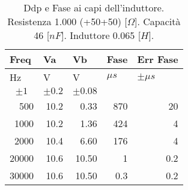 \begin{table}[H]
\begin{center}
\begin{tabular}{|r|r|r|r|r|}
\hline
\multicolumn{1}{|l|}{Freq} & \multicolumn{1}{l|}{Va} & \multicolumn{1}{l|}{Vb} & \multicolumn{1}{l|}{Fase } & \multicolumn{1}{l|}{Err Fase} \\ \hline
\multicolumn{1}{|l|}{Hz} & \multicolumn{1}{l|}{V} & \multicolumn{1}{l|}{V} & \multicolumn{1}{l|}{$\mu s$} & \multicolumn{1}{l|}{$\pm \mu s$} \\ \hline
\multicolumn{1}{|c|}{$\pm 1$} & \multicolumn{1}{c|}{$\pm 0.2$} & \multicolumn{1}{c|}{$\pm 0.08$} & \multicolumn{1}{l|}{} & \multicolumn{1}{l|}{} \\ \hline
500 & 10.2 & 0.33 & 870 & 20 \\ \hline
1000 & 10.2 & 1.36 & 424 & 4 \\ \hline
2000 & 10.4 & 6.60 & 176 & 4 \\ \hline
20000 & 10.6 & 10.50 & 1 & 0.2 \\ \hline
30000 & 10.6 & 10.50 & 0.3 & 0.2 \\ \hline
\end{tabular}
\end{center}
\caption{Ddp e Fase ai capi dell'induttore.
Resistenza 1.000 (+50+50)  [$\Omega$].
Capacità  46    [$nF$].
Induttore 0.065 [$H$].
}
\label{tab:C2_P2_ind}
\end{table}
